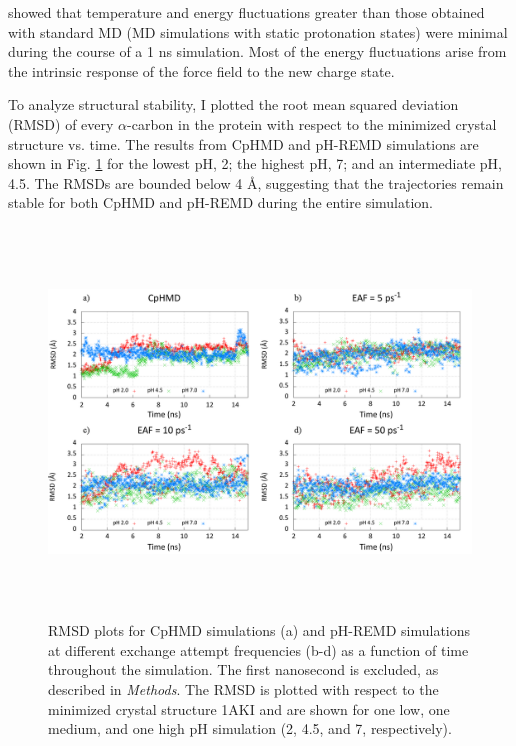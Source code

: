 \citeauthor{Mongan_JComputChem_2004_v25_p2038}
\cite{Mongan_JComputChem_2004_v25_p2038} showed that temperature and energy
fluctuations greater than those obtained with standard MD (\ie MD simulations
with static protonation states) were minimal during the course of a 1 ns
simulation. Most of the energy fluctuations arise from the intrinsic response of
the force field to the new charge state.

To analyze structural stability, I plotted the root mean squared deviation
(RMSD) of every $\alpha$-carbon in the protein with respect to the minimized
crystal structure vs. time. The results from CpHMD and pH-REMD simulations are
shown in Fig. \ref{fig3:RMSD} for the lowest pH, 2; the highest pH, 7; and an
intermediate pH, 4.5. The RMSDs are bounded below 4 \AA, suggesting that the
trajectories remain stable for both CpHMD and pH-REMD during the entire
simulation.

\begin{figure}
 \includegraphics[width=6.5in, height=4.06in]{1AKI_RMSD_Comparison.png}
 \caption{RMSD plots for CpHMD simulations (a) and pH-REMD simulations at
          different exchange attempt frequencies (b-d) as a function of time
          throughout the simulation. The first nanosecond is excluded, as
          described in \emph{Methods}. The RMSD is plotted with respect to the
          minimized crystal structure 1AKI and are shown for one low, one
          medium, and one high pH simulation (2, 4.5, and 7, respectively).}
 \label{fig3:RMSD}
\end{figure}

